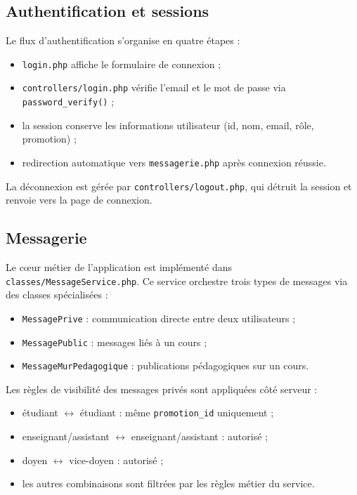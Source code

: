 \documentclass[12pt,a4paper]{article}
\begin{document}
\subsection{Authentification et sessions}

Le flux d'authentification s'organise en quatre étapes :
\begin{itemize}
  \item \texttt{login.php} affiche le formulaire de connexion ;
  \item \texttt{controllers/login.php} vérifie l'email et le mot de passe via \texttt{password\_verify()} ;
  \item la session conserve les informations utilisateur (id, nom, email, rôle, promotion) ;
  \item redirection automatique vers \texttt{messagerie.php} après connexion réussie.
\end{itemize}

La déconnexion est gérée par \texttt{controllers/logout.php}, qui détruit la session et renvoie vers la page de connexion.

\subsection{Messagerie}

Le cœur métier de l'application est implémenté dans \texttt{classes/MessageService.php}. Ce service orchestre trois types de messages via des classes spécialisées :

\begin{itemize}
  \item \texttt{MessagePrive} : communication directe entre deux utilisateurs ;
  \item \texttt{MessagePublic} : messages liés à un cours ;
  \item \texttt{MessageMurPedagogique} : publications pédagogiques sur un cours.
\end{itemize}

Les règles de visibilité des messages privés sont appliquées côté serveur :
\begin{itemize}
  \item étudiant $\leftrightarrow$ étudiant : même \texttt{promotion\_id} uniquement ;
  \item enseignant/assistant $\leftrightarrow$ enseignant/assistant : autorisé ;
  \item doyen $\leftrightarrow$ vice-doyen : autorisé ;
  \item les autres combinaisons sont filtrées par les règles métier du service.
\end{itemize}
\end{document}

